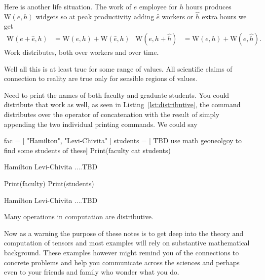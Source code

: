 Here is another life situation.  The work of $e$ employee for $h$ hours produces 
$\text{W}(e,h)$ widgets
so at peak productivity adding $\hat{e}$ workers or $\hat{h}$ extra hours we get
\begin{align*}
    \text{W}(e+\hat{e},h)& =\text{W}(e,h)+\text{W}(\hat{e},h)
    &
    \text{W}(e,h+\hat{h})& =\text{W}(e,h)+\text{W}(e,\hat{h}).
\end{align*}
Work distributes, both over workers and over time.

Well all this is at least true for some range of values.  All scientific
claims of connection to reality are true only for sensible regions of values.

Need to print the names of both faculty and graduate students. 
You could distribute that work as well, as seen in Listing~\ref{lst:distributive},
the command  distributes over the operator of concatenation 
with the result of simply appending the two individual printing commands.
We could say 
\begin{center}
\end{center}

\begin{lstfloat}
\begin{notebookin}
fac = [ "Hamilton", "Levi-Chivita" ]
students = [ TBD use math geoneolgoy to find some students of these]
Print(faculty cat students)
\end{notebookin}
\begin{notebookout}
Hamilton
Levi-Chivita
....TBD
\end{notebookout}
\begin{notebookin}
Print(faculty)
Print(students)
\end{notebookin}
\begin{notebookout}
Hamilton
Levi-Chivita
....TBD
\end{notebookout}
\caption{Many operations in computation are distributive.}\label{lst:distributive}
\end{lstfloat}

Now as a warning the purpose of these notes is to get deep into the theory and 
computation of tensors and most examples will rely on substantive mathematical 
background.  These examples however might remind you of the connections to 
concrete problems and help you communicate across the sciences and perhaps 
even to your friends and family who wonder what you do.

